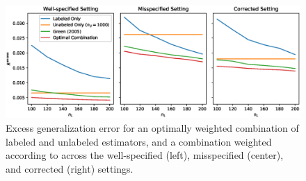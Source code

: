 
\begin{figure}
    \centering
    \includegraphics[width=.48\textwidth]{eps_figures/combined.eps}
    \caption{Excess generalization error for an optimally weighted combination of labeled and unlabeled estimators, and a combination weighted according to \cite{GreenStrawderman2001} across the well-specified (left), misspecified (center), and corrected (right) settings. %
    }
    \label{fig:combined}
\end{figure}